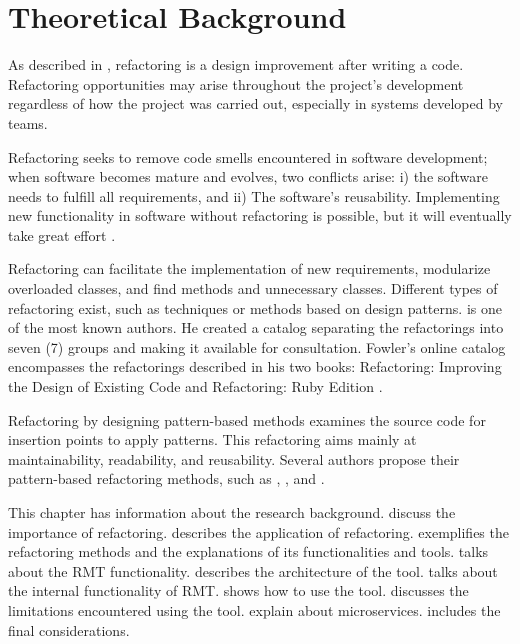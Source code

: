 \chapter{Theoretical Background}
\label{cap-background}

As described in \textcite{fowler2018refactoring}, refactoring is a design improvement after writing a code. Refactoring opportunities may arise throughout the project's development regardless of how the project was carried out, especially in systems developed by teams.

Refactoring seeks to remove code smells encountered in software development; when software becomes mature and evolves, two conflicts arise: i) the software needs to fulfill all requirements, and ii) The software's reusability. Implementing new functionality in software without refactoring is possible, but it will eventually take great effort \cite{Gamma2009}.

Refactoring can facilitate the implementation of new requirements, modularize overloaded classes, and find methods and unnecessary classes. Different types of refactoring exist, such as techniques or methods based on design patterns. \textcite{fowler2018refactoring} is one of the most known authors. He created a catalog separating the refactorings into seven (7) groups and making it available for consultation. Fowler's online catalog encompasses the refactorings described in his two books: Refactoring: Improving the Design of Existing Code \cite{fowler2018refactoring} and Refactoring: Ruby Edition \cite{fields2009refactoring}. 

Refactoring by designing pattern-based methods examines the source code for insertion points to apply patterns. This refactoring aims mainly at maintainability, readability, and reusability. Several authors propose their pattern-based refactoring methods, such as \textcite{cinneide2000automated}, \textcite{Gamma2009}, and \textcite{ouni2017more}.

This chapter has information about the research background.  discuss the importance of refactoring.  describes the application of refactoring.  exemplifies the refactoring methods and the explanations of its functionalities and tools.  talks about the RMT functionality.  describes the architecture of the tool.  talks about the internal functionality of RMT.  shows how to use the tool.  discusses the limitations encountered using the tool.  explain about microservices.  includes the final considerations.

